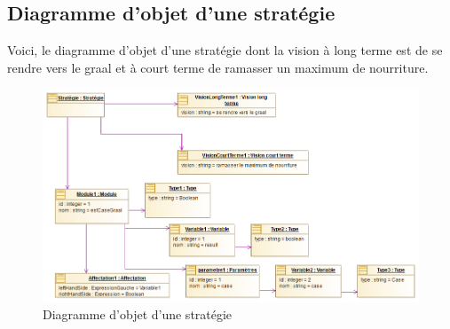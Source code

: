 
\subsection{Diagramme d'objet d'une stratégie}
\label{sec:question-21}

Voici, le diagramme d'objet d'une stratégie dont la vision à long terme est de se rendre vers le graal et à court terme de ramasser un maximum de nourriture.

\begin{figure}[h!]
	\centering
	\includegraphics[width=500pt]{assets/diagramme_objet_strat}
	\caption{Diagramme d'objet d'une stratégie}
	\label{fig:diagramme_objet_strat}
\end{figure}

\newpage
